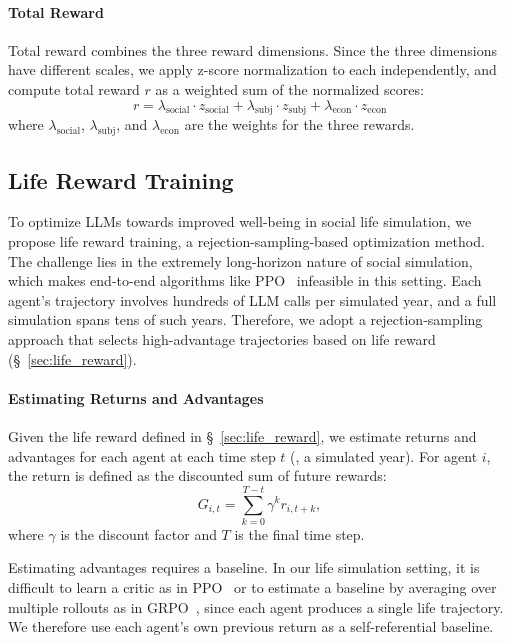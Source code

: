 \paragraph{Total Reward}
Total reward combines the three reward dimensions.
Since the three dimensions have different scales, we apply z-score normalization to each independently, and compute total reward $r$ as a weighted sum of the normalized scores:
\begin{equation}
r = \lambda_{\text{social}} \cdot z_{\text{social}} + \lambda_{\text{subj}} \cdot z_{\text{subj}} + \lambda_{\text{econ}} \cdot z_{\text{econ}}
\end{equation}
where $\lambda_{\text{social}}$, $\lambda_{\text{subj}}$, and $\lambda_{\text{econ}}$ are the weights for the three rewards.


\subsection{Life Reward Training}
\label{sec:training_data}

To optimize LLMs towards improved well-being in social life simulation, we propose life reward training, a rejection-sampling-based optimization method.
The challenge lies in the extremely long-horizon nature of social simulation, which makes end-to-end algorithms like PPO~\citep{schulman2017proximal} infeasible in this setting.
Each agent's trajectory involves hundreds of LLM calls per simulated year, and a full simulation spans tens of such years.
Therefore, we adopt a rejection-sampling approach that selects high-advantage trajectories based on life reward (\S~\ref{sec:life_reward}).

\paragraph{Estimating Returns and Advantages}
Given the life reward defined in \S~\ref{sec:life_reward}, we estimate returns and advantages for each agent at each time step \(t\) (\ie, a simulated year). For agent \(i\), the return is defined as the discounted sum of future rewards:
\[
G_{i,t} = \sum_{k=0}^{T-t} \gamma^k r_{i,t+k},
\]
where \(\gamma\) is the discount factor and \(T\) is the final time step.

Estimating advantages requires a baseline. In our life simulation setting, it is difficult to learn a critic as in PPO~\citep{schulman2017proximal} or to estimate a baseline by averaging over multiple rollouts as in GRPO~\citep{guo2025deepseek}, since each agent produces a single life trajectory. We therefore use each agent's own previous return as a self-referential baseline.

